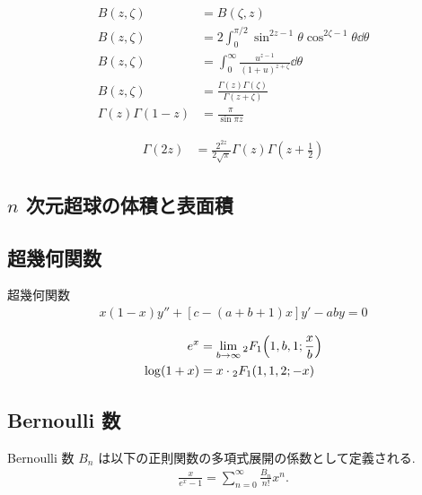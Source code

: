 \documentclass[uplatex,dvipdfmx,a4paper,11pt]{jlreq}
\theoremstyle{definition}
\begin{document}
\begin{proposition}
  \begin{align}
    B(z, \zeta)            & = B(\zeta, z)                                                          \\
    B(z, \zeta)            & = 2\int_0^{\pi/2}\sin^{2z - 1}\theta\cos^{2\zeta - 1}\theta\dd{\theta} \\
    B(z, \zeta)            & = \int_0^{\infty}\frac{u^{z-1}}{(1 + u)^{z + \zeta}}\dd{\theta}        \\
    B(z, \zeta)            & = \frac{\Gamma(z)\Gamma(\zeta)}{\Gamma(z + \zeta)}                     \\
    \Gamma(z)\Gamma(1 - z) & = \frac{\pi}{\sin\pi z}
  \end{align}
\end{proposition}

\begin{proposition}
  \begin{align}
    \Gamma(2z) & = \frac{2^{2z}}{2\sqrt{\pi}}\Gamma(z)\Gamma(z + \frac{1}{2})
  \end{align}
\end{proposition}


\subsection{$n$ 次元超球の体積と表面積}

\subsection{超幾何関数}
\begin{definition}
  超幾何関数
  \begin{align}
    x(1 - x)y'' + [c - (a + b + 1)x]y' - aby = 0
  \end{align}
\end{definition}
\begin{proposition}
  \begin{align}
    e^x         & = \lim_{b\to\infty}{}_2F_1\qty(1,b,1;\frac{x}{b}) \\
    \log(1 + x) & = x\cdot{}_2F_1(1,1,2;-x)
  \end{align}
\end{proposition}

\subsection{Bernoulli 数}
\begin{definition}[Bernoulli 数]
  Bernoulli 数 $B_n$ は以下の正則関数の多項式展開の係数として定義される.
  \begin{align}
    \frac{x}{e^x - 1} = \sum_{n=0}^{\infty}\frac{B_n}{n!}x^n.
  \end{align}
\end{definition}
\end{document}
